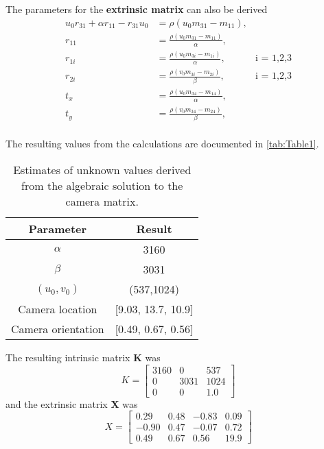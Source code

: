 \documentclass[12pt]{report}
\begin{document}
\begin{enumerate}
\begin{enumerate}
    The parameters for the \textbf{extrinsic matrix} can also be derived
    \begin{align*}
    u_0 r_{31} + \alpha r_{11} - r_{31} u_0 & = \rho (u_0 m_{31} - m_{11}), \\
    r_{11} & = \frac {\rho (u_0 m_{31} - m_{11})}{\alpha}, & {}\\
    r_{1i} & = \frac {\rho (u_0 m_{3i} - m_{1i})}{\alpha}, & \text{i = 1,2,3}\\
    r_{2i} & = \frac {\rho (v_0 m_{3i} - m_{2i})}{\beta}, & \text{i = 1,2,3}\\
    t_{x} & = \frac {\rho (u_0 m_{34} - m_{14})}{\alpha}, & {}\\
    t_{y} & = \frac {\rho (v_0 m_{34} - m_{24})}{\beta}, & {}\\
    \end{align*}

    The resulting values from the calculations are documented in \autoref{tab:Table1}.
    \begin{table}[h!]
    \begin{center}
    \begin{tabular}{ ||c | c|| } 
        \hline
        Parameter & Result \\ 
        \hline \hline
        $\alpha$ & 3160 \\ 
        $\beta$  & 3031 \\ 
        $(u_0,v_0)$ & (537,1024) \\ 
        Camera location & [9.03, 13.7, 10.9] \\ 
        Camera orientation & [0.49, 0.67, 0.56] \\
        \hline
    \end{tabular}
    \caption{Estimates of unknown values derived from the algebraic solution to the camera matrix.}
    \label{tab:Table1}
    \end{center}
    \end{table}
    The resulting intrinsic matrix $\mathbf{K}$ was 
    $$
    K = \begin{bmatrix}
    3160 & 0 & 537 \\
        0 & 3031 & 1024 \\
        0 & 0 & 1.0
    \end{bmatrix}
    $$
    and the extrinsic matrix $\mathbf{X}$ was
    $$
    X = \begin{bmatrix}
    0.29 & 0.48 & -0.83 & 0.09 \\
    -0.90 & 0.47 & -0.07 & 0.72 \\
    0.49 & 0.67 & 0.56 & 19.9
    \end{bmatrix}
    $$


\end{enumerate}
\end{enumerate}
\end{document}
